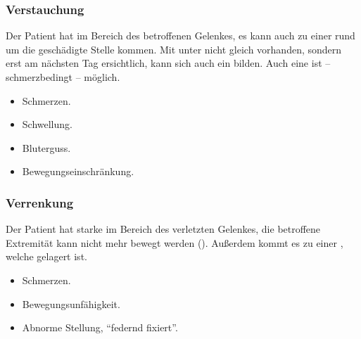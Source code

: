 \subsubsection{Verstauchung}


{
Der Patient hat  im Bereich des betroffenen Gelenkes, es
kann auch zu einer  rund um die geschädigte Stelle kommen. Mit
unter nicht gleich vorhanden, sondern erst am nächsten Tag ersichtlich,
kann sich auch ein  bilden. Auch eine  ist -- schmerzbedingt -- möglich. 
}{
\begin{itemize}
  \item Schmerzen.
  \item Schwellung.
  \item Bluterguss.
  \item Bewegungseinschränkung.
\end{itemize}
}{}{}{}



\subsubsection{Verrenkung}




{
Der Patient hat starke  im Bereich des verletzten Gelenkes,
die betroffene Extremität kann nicht mehr bewegt werden
(). Außerdem kommt es zu einer , welche  gelagert ist. 
}{
\begin{itemize}
    \item Schmerzen.
    \item Bewegungsunfähigkeit.
    \item Abnorme Stellung, "`federnd fixiert"'.
\end{itemize}
}{}{}{}

